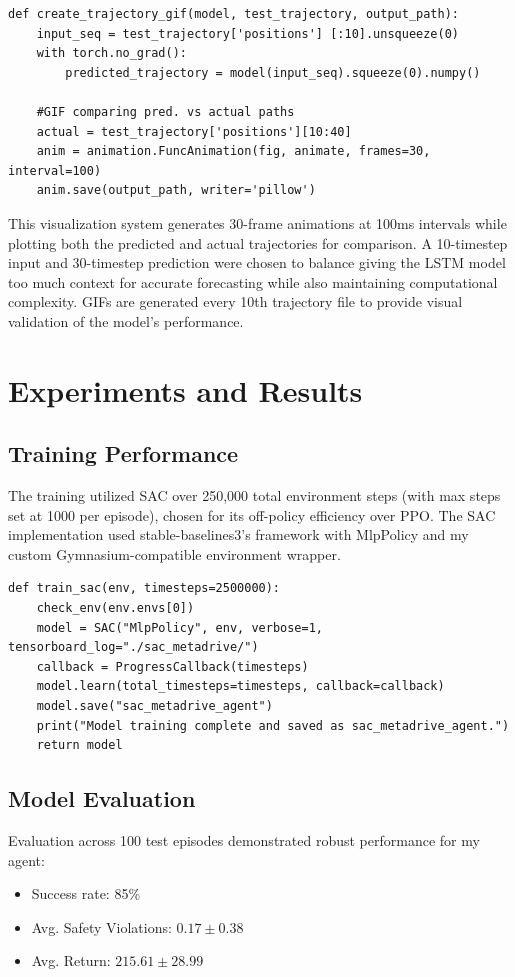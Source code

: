 \documentclass[10pt]{IEEEtran}
\begin{document}
\begin{lstlisting}
def create_trajectory_gif(model, test_trajectory, output_path):
    input_seq = test_trajectory['positions'] [:10].unsqueeze(0)
    with torch.no_grad():
        predicted_trajectory = model(input_seq).squeeze(0).numpy()
        
    #GIF comparing pred. vs actual paths
    actual = test_trajectory['positions'][10:40]
    anim = animation.FuncAnimation(fig, animate, frames=30, interval=100)
    anim.save(output_path, writer='pillow')
\end{lstlisting}

This visualization system generates 30-frame animations at 100ms intervals while plotting both the predicted and actual trajectories for comparison. A 10-timestep input and 30-timestep prediction were chosen to balance giving the LSTM model too much context for accurate forecasting while also maintaining computational complexity. GIFs are generated every 10th trajectory file to provide visual validation of the model's performance.

\section{Experiments and Results}
\subsection{Training Performance}
The training utilized SAC over 250,000 total environment steps (with max steps set at 1000 per episode), chosen for its off-policy efficiency over PPO. The SAC implementation used stable-baselines3's framework with MlpPolicy and my custom Gymnasium-compatible environment wrapper.

\begin{lstlisting}
def train_sac(env, timesteps=2500000):
    check_env(env.envs[0])
    model = SAC("MlpPolicy", env, verbose=1, tensorboard_log="./sac_metadrive/")
    callback = ProgressCallback(timesteps)
    model.learn(total_timesteps=timesteps, callback=callback)
    model.save("sac_metadrive_agent")
    print("Model training complete and saved as sac_metadrive_agent.")
    return model
\end{lstlisting}

\subsection{Model Evaluation}
Evaluation across 100 test episodes demonstrated robust performance for my agent:
\begin{itemize}
\item Success rate: 85\%
\item Avg. Safety Violations: $0.17 \pm 0.38$
\item Avg. Return: $215.61 \pm 28.99$
\end{itemize}
\end{document}
